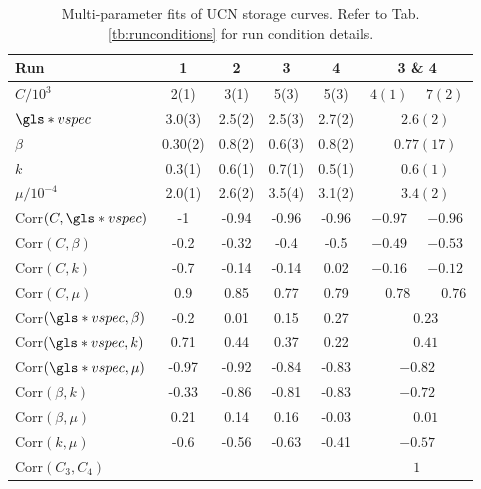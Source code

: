 \begin{table}[ht]
\centering
\caption[Multi-parameter fits of UCN storage curves]{\label{tb:fitResults}Multi-parameter fits of UCN storage curves. Refer to Tab. \ref{tb:runconditions} for run condition details.}
\begin{tabular}{
l
S
S
S
S
c
c}
\toprule
Run					& 1				& 2				& 3				& 4				& 							\\
\midrule
$C/10^3$			& 2(1)			& 3(1)			& 5(3)			& 5(3)			&  & $7(2)$					\\
$\gls*{vspec}$			& 3.0(3)		& 2.5(2)		& 2.5(3)		& 2.7(2)		& 				\\
$\beta$				& 0.30(2)		& 0.8(2)		& 0.6(3)		& 0.8(2)		& 				\\
$k$					& 0.3(1)		& 0.6(1)		& 0.7(1)		& 0.5(1)		& 				\\
$\mu/10^{-4}$		& 2.0(1)		& 2.6(2)		& 3.5(4)		& 3.1(2)		& 							\\
Corr$(C,\gls*{vspec})$		& -1			& -0.94			& -0.96			& -0.96			& 				& $-0.96$	\\
Corr$(C,\beta)$		& -0.2			& -0.32			& -0.4			& -0.5			& 				& $-0.53$	\\
Corr$(C,k)$			& -0.7			& -0.14			& -0.14			& 0.02			& 				& $-0.12$	\\
Corr$(C,\mu)$		& 0.9			& 0.85			& 0.77			& 0.79			& 		& $\phantom{-}0.76$	\\
Corr$(\gls*{vspec},\beta)$	& -0.2			& 0.01			& 0.15			& 0.27			& 					\\
Corr$(\gls*{vspec},k)$		& 0.71			& 0.44			& 0.37			& 0.22			& 					\\
Corr$(\gls*{vspec},\mu)$	& -0.97			& -0.92			& -0.84			& -0.83			& 							\\
Corr$(\beta,k)$		& -0.33			& -0.86			& -0.81			& -0.83			& 							\\
Corr$(\beta,\mu)$	& 0.21			& 0.14			& 0.16			& -0.03			& 					\\
Corr$(k,\mu)$		& -0.6			& -0.56			& -0.63			& -0.41			& 							\\
Corr$(C_3,C_4)$		& 				& 				& 				& 				& 		\\
\bottomrule
\end{tabular}
\end{table}

